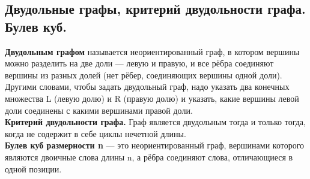 \subsection{Двудольные графы, критерий двудольности графа. Булев куб.}


 \textbf{Двудольным графом} называется неориентированный граф, в котором вершины можно разделить на две доли — левую и правую, и все рёбра соединяют вершины из разных долей (нет рёбер, соединяющих вершины одной доли). Другими словами, чтобы задать двудольный граф, надо указать два конечных множества L (левую долю) и R (правую долю) и указать, какие вершины левой доли соединены с какими вершинами правой доли. \\

\textbf{Критерий двудольности графа.} Граф является двудольным тогда и только тогда, когда не содержит в себе циклы нечетной длины. \\


\textbf{Булев куб размерности n} — это неориентированный граф, вершинами которого являются двоичные слова длины n, а рёбра соединяют слова, отличающиеся в одной позиции.